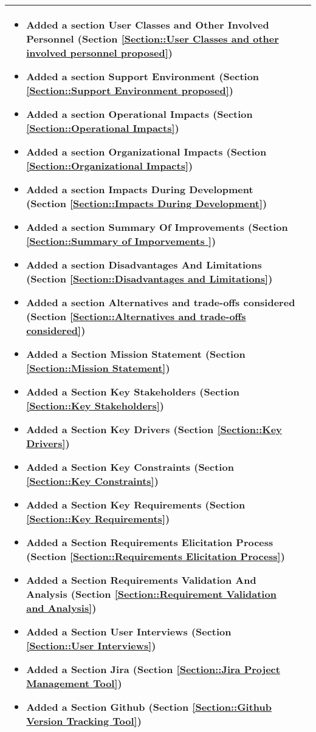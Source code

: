 \begin{longtable}{|l||p{13.5cm}|}
\begin{itemize}[topsep=0pt,itemsep=0pt,parsep=0pt,partopsep=0pt,leftmargin=12pt]
\item Added a section User Classes and Other Involved Personnel (Section \ref{Section::User Classes and other involved personnel proposed})
\item Added a section Support Environment (Section \ref{Section::Support Environment proposed})
\item Added a section Operational Impacts (Section \ref{Section::Operational Impacts})
\item Added a section Organizational Impacts (Section \ref{Section::Organizational Impacts})
\item Added a section Impacts During Development (Section \ref{Section::Impacts During Development})
\item Added a section Summary Of Improvements (Section \ref{Section::Summary of Imporvements })
\item Added a section Disadvantages And Limitations (Section \ref{Section::Disadvantages and Limitations})
\item Added a section Alternatives and trade-offs considered (Section \ref{Section::Alternatives and trade-offs considered})
\item Added a Section Mission Statement (Section \ref{Section::Mission Statement})
\item Added a Section Key Stakeholders (Section \ref{Section::Key Stakeholders})
\item Added a Section Key Drivers (Section \ref{Section::Key Drivers})
\item Added a Section Key Constraints (Section \ref{Section::Key Constraints})
\item Added a Section Key Requirements  (Section \ref{Section::Key Requirements})
\item Added a Section Requirements Elicitation Process  (Section \ref{Section::Requirements Elicitation Process})
\item Added a Section Requirements Validation And Analysis  (Section \ref{Section::Requirement Validation and Analysis})
\item Added a Section User Interviews  (Section \ref{Section::User Interviews})
\item Added a Section Jira  (Section \ref{Section::Jira Project Management Tool})

\item Added a Section Github (Section \ref{Section::Github Version Tracking Tool})

\end{itemize} 
\\ \hline


\end{longtable}


